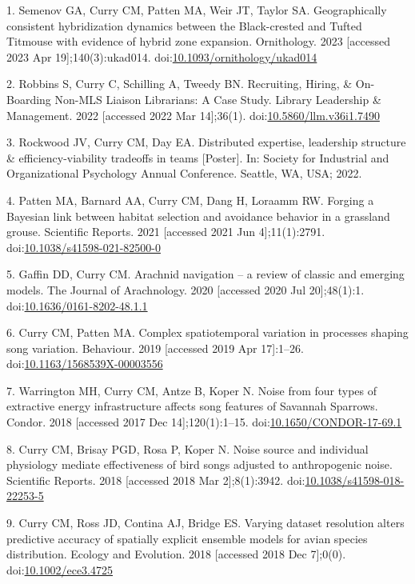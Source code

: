 \documentclass[
  letterpaper,
  DIV=11,
  numbers=noendperiod,
  oneside]{scrreprt}
\begin{document}
1. Semenov GA, Curry CM, Patten MA, Weir JT, Taylor SA. Geographically
consistent hybridization dynamics between the {Black-crested} and
{Tufted Titmouse} with evidence of hybrid zone expansion. Ornithology.
2023 {[}accessed 2023 Apr 19{]};140(3):ukad014.
doi:\href{https://doi.org/10.1093/ornithology/ukad014}{10.1093/ornithology/ukad014}

2. Robbins S, Curry C, Schilling A, Tweedy BN. Recruiting, {Hiring}, \&
{On-Boarding Non-MLS Liaison Librarians}: {A Case Study}. Library
Leadership \& Management. 2022 {[}accessed 2022 Mar 14{]};36(1).
doi:\href{https://doi.org/10.5860/llm.v36i1.7490}{10.5860/llm.v36i1.7490}

3. Rockwood JV, Curry CM, Day EA. Distributed expertise, leadership
structure \& efficiency-viability tradeoffs in teams {[}{Poster}{]}. In:
Society for {Industrial} and {Organizational Psychology Annual
Conference}. Seattle, WA, USA; 2022.

4. Patten MA, Barnard AA, Curry CM, Dang H, Loraamm RW. Forging a
{Bayesian} link between habitat selection and avoidance behavior in a
grassland grouse. Scientific Reports. 2021 {[}accessed 2021 Jun
4{]};11(1):2791.
doi:\href{https://doi.org/10.1038/s41598-021-82500-0}{10.1038/s41598-021-82500-0}

5. Gaffin DD, Curry CM. Arachnid navigation -- a review of classic and
emerging models. The Journal of Arachnology. 2020 {[}accessed 2020 Jul
20{]};48(1):1.
doi:\href{https://doi.org/10.1636/0161-8202-48.1.1}{10.1636/0161-8202-48.1.1}

6. Curry CM, Patten MA. Complex spatiotemporal variation in processes
shaping song variation. Behaviour. 2019 {[}accessed 2019 Apr
17{]}:1--26.
doi:\href{https://doi.org/10.1163/1568539X-00003556}{10.1163/1568539X-00003556}

7. Warrington MH, Curry CM, Antze B, Koper N. Noise from four types of
extractive energy infrastructure affects song features of {Savannah
Sparrows}. Condor. 2018 {[}accessed 2017 Dec 14{]};120(1):1--15.
doi:\href{https://doi.org/10.1650/CONDOR-17-69.1}{10.1650/CONDOR-17-69.1}

8. Curry CM, Brisay PGD, Rosa P, Koper N. Noise source and individual
physiology mediate effectiveness of bird songs adjusted to anthropogenic
noise. Scientific Reports. 2018 {[}accessed 2018 Mar 2{]};8(1):3942.
doi:\href{https://doi.org/10.1038/s41598-018-22253-5}{10.1038/s41598-018-22253-5}

9. Curry CM, Ross JD, Contina AJ, Bridge ES. Varying dataset resolution
alters predictive accuracy of spatially explicit ensemble models for
avian species distribution. Ecology and Evolution. 2018 {[}accessed 2018
Dec 7{]};0(0).
doi:\href{https://doi.org/10.1002/ece3.4725}{10.1002/ece3.4725}
\end{document}
